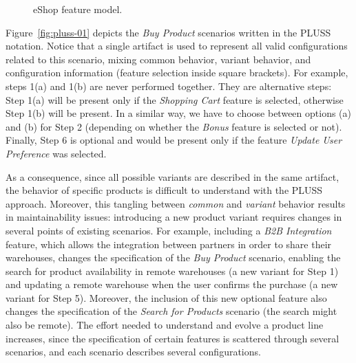 \documentclass{acm_proc_article-sp}
\begin{document}
\begin{figure}[th]
\begin{center}

\caption{eShop feature model.}
\label{fig:eshop-fm}
\end{center}
\end{figure} 





Figure~\ref{fig:pluss-01} depicts the \emph{Buy Product} scenarios written in
the PLUSS notation. Notice that a single artifact is used to represent all valid
configurations related to this scenario, mixing common behavior, variant
behavior, and configuration information (feature selection inside square
brackets). For example, steps 1(a) and 1(b) are never performed together. They
are alternative steps: Step 1(a) will be present only if the \emph{Shopping
Cart} feature is selected, otherwise Step 1(b) will be present. In a similar
way, we have to choose between options (a) and (b) for Step 2 (depending
on whether the \emph{Bonus} feature is selected or not). Finally, Step 6 is
optional and would be present only if the feature \emph{Update User Preference} was selected.

As a consequence, since all possible variants are described in the same
artifact, the behavior of specific products is difficult to understand with the
PLUSS approach. Moreover, this tangling between \emph{common} and
\emph{variant} behavior results in maintainability issues: introducing a new product variant
requires changes in several points of existing scenarios. For example, including a
\emph{B2B Integration} feature, which allows the integration between partners in
order to share their warehouses, changes the specification of the \emph{Buy
Product} scenario, enabling the search for product availability in remote
warehouses (a new variant for Step 1) and updating a remote warehouse when the
user confirms the purchase (a new variant for Step 5). Moreover, the inclusion of
this new optional feature also changes the specification of the \emph{Search for
Products} scenario (the search might also be remote). The effort
needed to understand and evolve a product line increases, since the
specification of certain features is scattered through several scenarios,
and each scenario describes several configurations.
\end{document}
